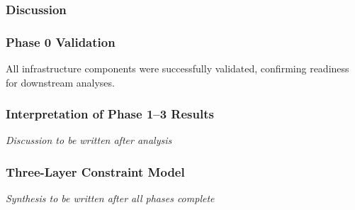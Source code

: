 \subsubsection{Discussion}

\subsubsection{Phase 0 Validation}

All infrastructure components were successfully validated, confirming readiness for downstream analyses.

\subsubsection{Interpretation of Phase 1--3 Results}

\textit{Discussion to be written after analysis}

\subsubsection{Three-Layer Constraint Model}

\textit{Synthesis to be written after all phases complete}

